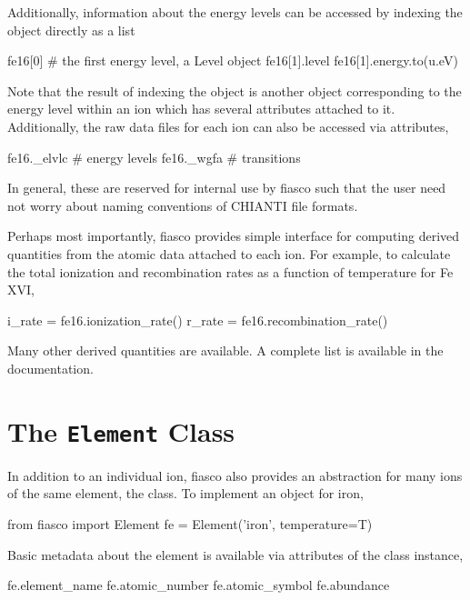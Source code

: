 Additionally, information about the energy levels can be accessed by indexing the object directly as a list
\begin{pyblock}[appendix1][baselinestretch=1,xleftmargin=3em]
fe16[0] # the first energy level, a Level object
fe16[1].level
fe16[1].energy.to(u.eV)
\end{pyblock}
Note that the result of indexing the  object is another object corresponding to the energy level within an ion which has several attributes attached to it. Additionally, the raw data files for each ion can also be accessed via attributes,
\begin{pyblock}[appendix1][baselinestretch=1,xleftmargin=3em]
fe16._elvlc # energy levels
fe16._wgfa # transitions 
\end{pyblock}
In general, these are reserved for internal use by fiasco such that the user need not worry about naming conventions of CHIANTI file formats.

Perhaps most importantly, fiasco provides simple interface for computing derived quantities from the atomic data attached to each ion. For example, to calculate the total ionization and recombination rates as a function of temperature for Fe XVI,
\begin{pyblock}[appendix1][baselinestretch=1,xleftmargin=3em]
i_rate = fe16.ionization_rate()
r_rate = fe16.recombination_rate()
\end{pyblock}
Many other derived quantities are available. A complete list is available in the documentation.

\section{The \texttt{Element} Class}\label{sec:fiasco-element}

In addition to an individual ion, fiasco also provides an abstraction for many ions of the same element, the  class. To implement an  object for iron,
\begin{pyblock}[appendix1][baselinestretch=1,xleftmargin=3em]
from fiasco import Element
fe = Element('iron', temperature=T)
\end{pyblock}
Basic metadata about the element is available via attributes of the class instance,
\begin{pyblock}[appendix1][baselinestretch=1,xleftmargin=3em]
fe.element_name
fe.atomic_number
fe.atomic_symbol
fe.abundance
\end{pyblock}

